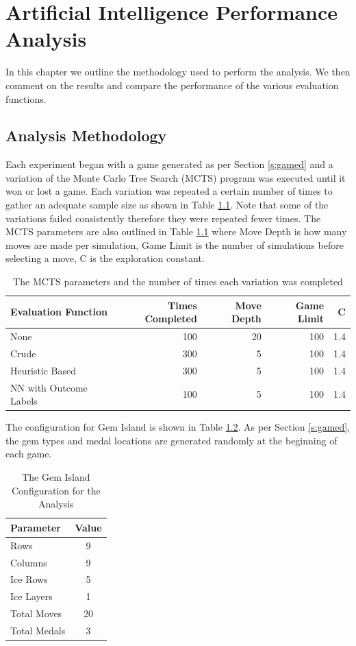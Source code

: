 \documentclass{bhamthesis}
\theoremstyle{definition}
\begin{document}
\chapter{Artificial Intelligence Performance Analysis}\label{ch:aiAnalysis}
In this chapter we outline the methodology used to perform the analysis. We then comment on the results and compare the performance of the various evaluation functions.

\section{Analysis Methodology}\label{s:analMeth}
Each experiment began with a game generated as per Section \ref{s:gamed} and a variation of the Monte Carlo Tree Search (MCTS) program was executed until it won or lost a game. Each variation was repeated a certain number of times to gather an adequate sample size as shown in Table \ref{t:MCTSConfig}. Note that some of the variations failed consistently therefore they were repeated fewer times. The MCTS parameters are also outlined in Table \ref{t:MCTSConfig} where Move Depth is how many moves are made per simulation, Game Limit is the number of simulations before selecting a move, C is the exploration constant. 

\begin{table}[]
	\centering
	\caption{The MCTS parameters and the number of times each variation was completed}
	\label{t:MCTSConfig}
	\begin{tabular}{lrrrr}
		\hline
		Evaluation Function    & Times Completed & Move Depth & Game Limit & C   \\ \hline
		None                   & 100             & 20         & 100        & 1.4 \\
		Crude                  & 300             & 5          & 100        & 1.4 \\
		Heuristic Based        & 300             & 5          & 100        & 1.4 \\
		NN with Outcome Labels & 100             & 5          & 100        & 1.4
	\end{tabular}
	\end{table}

The configuration for Gem Island is shown in Table \ref{t:analysisConfig}. As per Section \ref{s:gamed}, the gem types and medal locations are generated randomly at the beginning of each game. 

\begin{table}[]
	\centering
	\caption{The Gem Island Configuration for the Analysis}
	\label{t:analysisConfig}
	\begin{tabular}{lc}
		\hline
		Parameter    & Value \\ \hline
		Rows         & 9     \\
		Columns      & 9     \\
		Ice Rows      & 5     \\
		Ice Layers   & 1     \\
		Total Moves  & 20    \\
		Total Medals & 3    
	\end{tabular}
\end{table}
\end{document}
